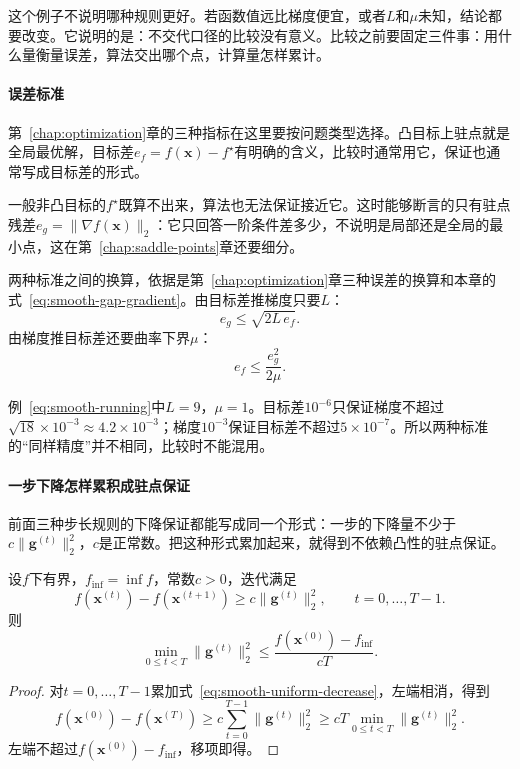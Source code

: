 这个例子不说明哪种规则更好。若函数值远比梯度便宜，或者$L$和$\mu$未知，结论都要改变。它说明的是：不交代口径的比较没有意义。比较之前要固定三件事：用什么量衡量误差，算法交出哪个点，计算量怎样累计。

\paragraph{误差标准}
第~\ref{chap:optimization}章的三种指标在这里要按问题类型选择。凸目标上驻点就是全局最优解，目标差$e_f=f(\bm{x})-f^\star$有明确的含义，比较时通常用它，保证也通常写成目标差的形式。

一般非凸目标的$f^\star$既算不出来，算法也无法保证接近它。这时能够断言的只有驻点残差$e_g=\lVert\nabla f(\bm{x})\rVert_2$：它只回答一阶条件差多少，不说明是局部还是全局的最小点，这在第~\ref{chap:saddle-points}章还要细分。

两种标准之间的换算，依据是第~\ref{chap:optimization}章三种误差的换算和本章的式~\eqref{eq:smooth-gap-gradient}。由目标差推梯度只要$L$：
\[
 e_g\leq\sqrt{2L\,e_f}.
\]
由梯度推目标差还要曲率下界$\mu$：
\[
 e_f\leq\frac{e_g^2}{2\mu}.
\]

例~\eqref{eq:smooth-running}中$L=9$，$\mu=1$。目标差$10^{-6}$只保证梯度不超过$\sqrt{18}\times10^{-3}\approx4.2\times10^{-3}$；梯度$10^{-3}$保证目标差不超过$5\times10^{-7}$。所以两种标准的“同样精度”并不相同，比较时不能混用。

\paragraph{一步下降怎样累积成驻点保证}
前面三种步长规则的下降保证都能写成同一个形式：一步的下降量不少于$c\lVert\bm{g}^{(t)}\rVert_2^2$，$c$是正常数。把这种形式累加起来，就得到不依赖凸性的驻点保证。

\begin{lemma}[累加下降]
\label{lem:smooth-telescoping}
设$f$下有界，$f_{\inf}=\inf f$，常数$c>0$，迭代满足
\begin{equation}
 f(\bm{x}^{(t)})-f(\bm{x}^{(t+1)})\geq c\lVert\bm{g}^{(t)}\rVert_2^2,\qquad t=0,\ldots,T-1.
 \label{eq:smooth-uniform-decrease}
\end{equation}
则
\begin{equation}
 \min_{0\leq t<T}\lVert\bm{g}^{(t)}\rVert_2^2\leq\frac{f(\bm{x}^{(0)})-f_{\inf}}{cT}.
 \label{eq:smooth-telescoping}
\end{equation}
\end{lemma}

\begin{proof}
对$t=0,\ldots,T-1$累加式~\eqref{eq:smooth-uniform-decrease}，左端相消，得到
\[
 f(\bm{x}^{(0)})-f(\bm{x}^{(T)})\geq c\sum_{t=0}^{T-1}\lVert\bm{g}^{(t)}\rVert_2^2\geq cT\min_{0\leq t<T}\lVert\bm{g}^{(t)}\rVert_2^2.
\]
左端不超过$f(\bm{x}^{(0)})-f_{\inf}$，移项即得。
\end{proof}

